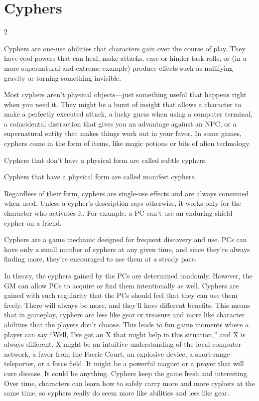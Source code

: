 \part{Cyphers}

\begin{multicols}{2}

Cyphers are one-use abilities that characters gain over the course of play. They have cool powers that can heal, make attacks, ease or hinder task rolls, or (in a more supernatural and extreme example) produce effects such as nullifying gravity or turning something invisible.

Most cyphers aren’t physical objects—just something useful that happens right when you need it. They might be a burst of insight that allows a character to make a perfectly executed attack, a lucky guess when using a computer terminal, a coincidental distraction that gives you an advantage against an NPC, or a supernatural entity that makes things work out in your favor. In some games, cyphers come in the form of items, like magic potions or bits of alien technology.

Cyphers that don’t have a physical form are called subtle cyphers.

Cyphers that have a physical form are called manifest cyphers.

Regardless of their form, cyphers are single-use effects and are always consumed when used. Unless a cypher’s description says otherwise, it works only for the character who activates it. For example, a PC can’t use an enduring shield cypher on a friend.

Cyphers are a game mechanic designed for frequent discovery and use. PCs can have only a small number of cyphers at any given time, and since they’re always finding more, they’re encouraged to use them at a steady pace. 

In theory, the cyphers gained by the PCs are determined randomly. However, the GM can allow PCs to acquire or find them intentionally as well. Cyphers are gained with such regularity that the PCs should feel that they can use them freely. There will always be more, and they’ll have different benefits. This means that in gameplay, cyphers are less like gear or treasure and more like character abilities that the players don’t choose. This leads to fun game moments where a player can say “Well, I’ve got an X that might help in this situation,” and X is always different. X might be an intuitive understanding of the local computer network, a favor from the Faerie Court, an explosive device, a short-range teleporter, or a force field. It might be a powerful magnet or a prayer that will cure disease. It could be anything. Cyphers keep the game fresh and interesting. Over time, characters can learn how to safely carry more and more cyphers at the same time, so cyphers really do seem more like abilities and less like gear.


\end{multicols}
